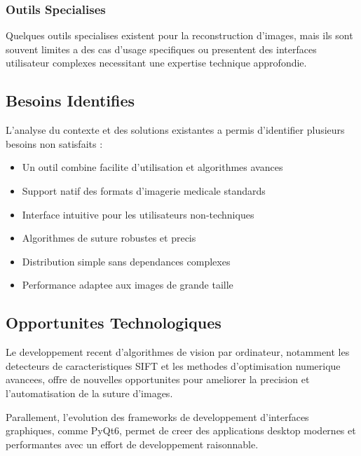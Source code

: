 \documentclass[12pt,a4paper]{article}
\begin{document}
\subsubsection{Outils Specialises}
Quelques outils specialises existent pour la reconstruction d'images, mais ils sont souvent limites a des cas d'usage specifiques ou presentent des interfaces utilisateur complexes necessitant une expertise technique approfondie.

\subsection{Besoins Identifies}

L'analyse du contexte et des solutions existantes a permis d'identifier plusieurs besoins non satisfaits :

\begin{itemize}
\item Un outil combine facilite d'utilisation et algorithmes avances
\item Support natif des formats d'imagerie medicale standards
\item Interface intuitive pour les utilisateurs non-techniques
\item Algorithmes de suture robustes et precis
\item Distribution simple sans dependances complexes
\item Performance adaptee aux images de grande taille
\end{itemize}

\subsection{Opportunites Technologiques}

Le developpement recent d'algorithmes de vision par ordinateur, notamment les detecteurs de caracteristiques SIFT et les methodes d'optimisation numerique avancees, offre de nouvelles opportunites pour ameliorer la precision et l'automatisation de la suture d'images.

Parallement, l'evolution des frameworks de developpement d'interfaces graphiques, comme PyQt6, permet de creer des applications desktop modernes et performantes avec un effort de developpement raisonnable.
\end{document}
